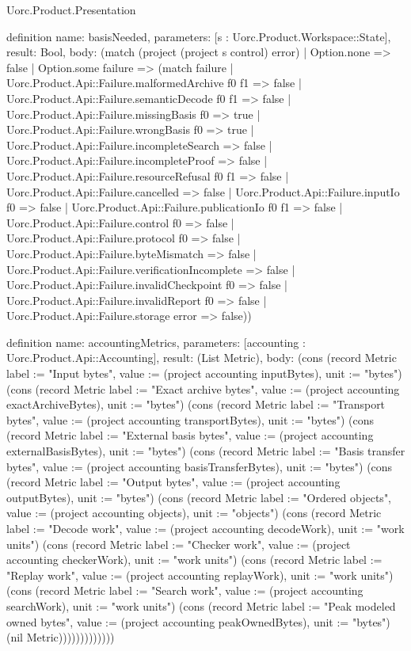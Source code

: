 \begin{lexlean}{Uorc.Product.Presentation}
\begin{semanticmodule}
definition{
  name: basisNeeded,
  parameters: [s : Uorc.Product.Workspace::State],
  result: Bool,
  body: (match (project (project s control) error)
    | Option.none => false
    | Option.some failure => (match failure
      | Uorc.Product.Api::Failure.malformedArchive f0 f1 => false
      | Uorc.Product.Api::Failure.semanticDecode f0 f1 => false
      | Uorc.Product.Api::Failure.missingBasis f0 => true
      | Uorc.Product.Api::Failure.wrongBasis f0 => true
      | Uorc.Product.Api::Failure.incompleteSearch => false
      | Uorc.Product.Api::Failure.incompleteProof => false
      | Uorc.Product.Api::Failure.resourceRefusal f0 f1 => false
      | Uorc.Product.Api::Failure.cancelled => false
      | Uorc.Product.Api::Failure.inputIo f0 => false
      | Uorc.Product.Api::Failure.publicationIo f0 f1 => false
      | Uorc.Product.Api::Failure.control f0 => false
      | Uorc.Product.Api::Failure.protocol f0 => false
      | Uorc.Product.Api::Failure.byteMismatch => false
      | Uorc.Product.Api::Failure.verificationIncomplete => false
      | Uorc.Product.Api::Failure.invalidCheckpoint f0 => false
      | Uorc.Product.Api::Failure.invalidReport f0 => false
      | Uorc.Product.Api::Failure.storage error => false))
}

definition{
  name: accountingMetrics,
  parameters: [accounting : Uorc.Product.Api::Accounting],
  result: (List Metric),
  body: (cons (record Metric {label := "Input bytes", value := (project accounting inputBytes), unit := "bytes"}) (cons (record Metric {label := "Exact archive bytes", value := (project accounting exactArchiveBytes), unit := "bytes"}) (cons (record Metric {label := "Transport bytes", value := (project accounting transportBytes), unit := "bytes"}) (cons (record Metric {label := "External basis bytes", value := (project accounting externalBasisBytes), unit := "bytes"}) (cons (record Metric {label := "Basis transfer bytes", value := (project accounting basisTransferBytes), unit := "bytes"}) (cons (record Metric {label := "Output bytes", value := (project accounting outputBytes), unit := "bytes"}) (cons (record Metric {label := "Ordered objects", value := (project accounting objects), unit := "objects"}) (cons (record Metric {label := "Decode work", value := (project accounting decodeWork), unit := "work units"}) (cons (record Metric {label := "Checker work", value := (project accounting checkerWork), unit := "work units"}) (cons (record Metric {label := "Replay work", value := (project accounting replayWork), unit := "work units"}) (cons (record Metric {label := "Search work", value := (project accounting searchWork), unit := "work units"}) (cons (record Metric {label := "Peak modeled owned bytes", value := (project accounting peakOwnedBytes), unit := "bytes"}) (nil Metric)))))))))))))
}


\end{semanticmodule}
\end{lexlean}
